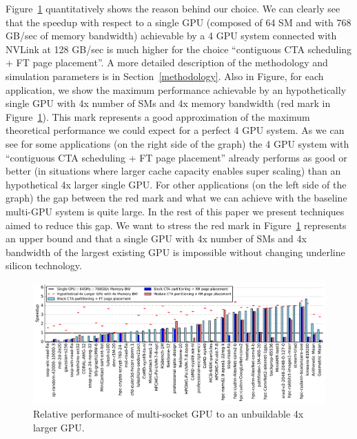 Figure~\ref{fig:motivation2} quantitatively shows the reason behind our 
choice. We can clearly see that the speedup with respect to a single GPU 
(composed of 64 SM and with 768 GB/sec of memory bandwidth) achievable by a 4 
GPU system connected with NVLink at 128 GB/sec is much higher for the choice 
``contiguous CTA scheduling + FT page placement''. A more detailed 
description of the methodology and simulation parameters is in 
Section~\ref{methodology}. 
Also in Figure, for each application, we show the maximum  performance 
achievable by an hypothetically single GPU with 4x number of SMs and 4x 
memory bandwidth (red mark in Figure~\ref{fig:motivation2}). This mark 
represents a good approximation of the 
maximum theoretical performance we could expect for a perfect 4 GPU system. 
As we can see for some applications (on the right side of the graph) the 4 
GPU system with ``contiguous CTA scheduling + FT page placement'' already 
performs as good or better (in situations where larger cache capacity enables 
super scaling) than an hypothetical 4x larger single GPU. For other 
applications (on the left side of the graph) the gap between the red mark and 
what we can achieve with the baseline multi-GPU system is quite large. In the 
rest of this paper we present techniques aimed to reduce this gap. 
We want to stress the red mark in Figure~\ref{fig:motivation2} represents an 
upper bound and that a single GPU with 4x number of SMs and 4x bandwidth of 
the largest existing GPU is impossible without changing underline silicon 
technology. 






\begin{figure}[tp]
    \centering
    \includegraphics[width=1\linewidth]{figures/plot_different_baselines.pdf}
    \caption{Relative performance of multi-socket GPU to an unbuildable 4x larger GPU.}
    \label{fig:motivation2}
\end{figure}

